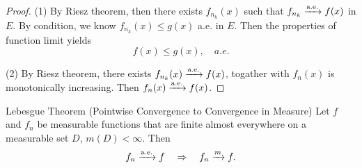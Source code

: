 \begin{proof}
  (1) By Riesz theorem, then there exists $f_{n_k}(x)$ such that $f_{n_k} \xrightarrow{\text{a.e.}} f(x)$ in $E$.
  By condition, we know $f_{n_k}(x) \leq g(x)$ a.e. in $E$.
  Then the properties of function limit yields
  \begin{equation}
    f(x) \leq g(x), \quad a.e.
  \end{equation}

  (2) By Riesz theorem, there exists $f_{n_k}(x) \xrightarrow{\text{a.e.}} f(x)$,
  togather with $f_n(x)$ is monotonically increasing.
  Then $f_n(x) \xrightarrow{\text{a.e.}} f(x)$.
\end{proof}

\begin{theorem}{Lebesgue Theorem (Pointwise Convergence to Convergence in Measure)}{}
  Let $f$ and $f_n$ be measurable functions that are finite almost everywhere on
  a measurable set $D$, $m(D) < \infty$. Then
  \begin{equation}
    f_n \xrightarrow{\text{a.e.}} f \quad \Rightarrow \quad f_n \xrightarrow{m} f.
  \end{equation}
\end{theorem}










